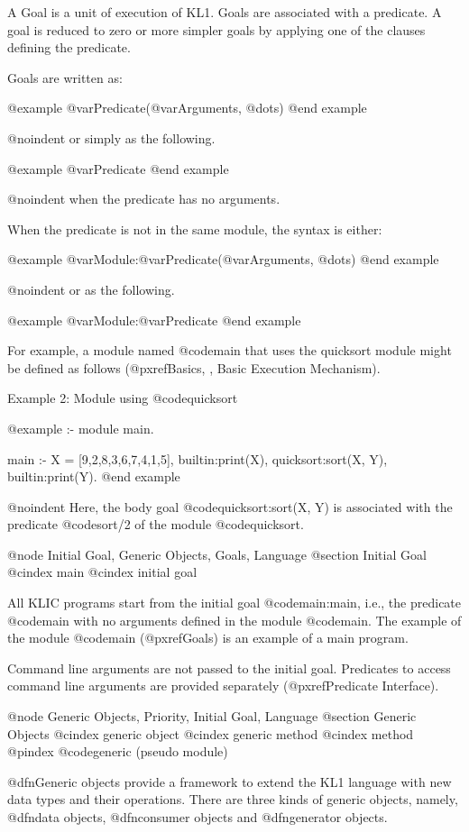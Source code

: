 A Goal is a unit of execution of KL1.  Goals are associated with a
predicate.  A goal is reduced to zero or more simpler goals by applying
one of the clauses defining the predicate.

Goals are written as:

@example
@var{Predicate}(@var{Arguments}, @dots{})
@end example

@noindent
or simply as the following.

@example
@var{Predicate}
@end example

@noindent
when the predicate has no arguments.

When the predicate is not in the same module, the syntax is either:

@example
@var{Module}:@var{Predicate}(@var{Arguments}, @dots{})
@end example

@noindent
or as the following.

@example
@var{Module}:@var{Predicate}
@end example

For example, a module named @code{main} that uses the quicksort module
might be defined as follows (@pxref{Basics, , Basic Execution
Mechanism}).

Example 2: Module using @code{quicksort}

@example
:- module main.

main :-
    X = [9,2,8,3,6,7,4,1,5],
    builtin:print(X),
    quicksort:sort(X, Y),
    builtin:print(Y).
@end example

@noindent
Here, the body goal @code{quicksort:sort(X, Y)} is associated with the
predicate @code{sort/2} of the module @code{quicksort}.

@node Initial Goal, Generic Objects, Goals, Language
@section Initial Goal
@cindex main
@cindex initial goal

All KLIC programs start from the initial goal @code{main:main}, i.e.,
the predicate @code{main} with no arguments defined in the module
@code{main}.  The example of the module @code{main} (@pxref{Goals}) is
an example of a main program.

Command line arguments are not passed to the initial goal.  Predicates
to access command line arguments are provided separately
(@pxref{Predicate Interface}).

@node Generic Objects, Priority, Initial Goal, Language
@section Generic Objects
@cindex generic object
@cindex generic method
@cindex method
@pindex @code{generic} (pseudo module)

@dfn{Generic objects} provide a framework to extend the KL1 language
with new data types and their operations.  There are three kinds of
generic objects, namely, @dfn{data objects}, @dfn{consumer objects} and
@dfn{generator objects}.

